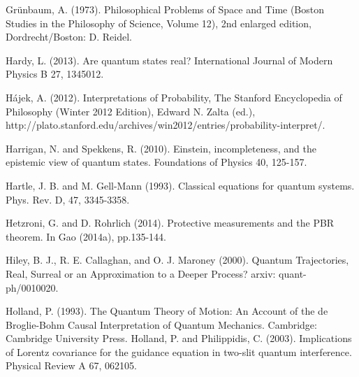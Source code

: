 \begin{thebibliography}{}
\bibitem{} Gr\"{u}nbaum, A. (1973). Philosophical Problems of Space and Time (Boston Studies in the Philosophy of Science, Volume 12), 2nd enlarged edition, Dordrecht/Boston: D. Reidel. 

\bibitem{} Hardy, L. (2013). Are quantum states real? International Journal of Modern Physics B 27, 1345012.

\bibitem{} H\'{a}jek, A. (2012). Interpretations of Probability, The Stanford Encyclopedia of Philosophy (Winter 2012 Edition), Edward N. Zalta (ed.), http://plato.stanford.edu/archives/win2012/entries/probability-interpret/.

\bibitem{} Harrigan, N. and Spekkens, R. (2010). Einstein, incompleteness, and the epistemic view of quantum states. Foundations of Physics 40, 125-157.

\bibitem{} Hartle, J. B. and M. Gell-Mann (1993). Classical equations for quantum systems. Phys. Rev. D, 47, 3345-3358.

\bibitem{} Hetzroni, G. and D. Rohrlich (2014). Protective measurements and the PBR theorem. In Gao (2014a), pp.135-144.

\bibitem{} Hiley, B. J., R. E. Callaghan,  and O. J. Maroney (2000). Quantum Trajectories, Real, Surreal or an Approximation to a Deeper Process? arxiv: quant-ph/0010020.

\bibitem{} Holland, P. (1993). The Quantum Theory of Motion: An Account of the de Broglie-Bohm Causal Interpretation of Quantum Mechanics. Cambridge: Cambridge University Press.
\bibitem{} Holland, P. and Philippidis, C. (2003). Implications of Lorentz covariance for the guidance equation in two-slit quantum interference. Physical Review A 67, 062105.





\end{thebibliography}
